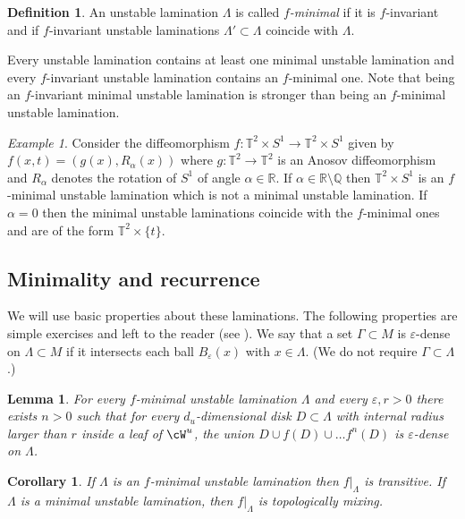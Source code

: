 \documentclass[a4paper,11pt]{amsart}
\numberwithin{equation}{section}     %
\def\QQ{{\mathbb Q}} \def\RR{{\mathbb R}} \def\SS{{\mathbb S}} \def\TT{{\mathbb T}}
\newtheorem{cor}[teo]{Corollary}
\newtheorem{lema}[teo]{Lemma}
\theoremstyle{definition}
\newtheorem{defi}[teo]{Definition}
\theoremstyle{remark}
\newtheorem{ej}[teo]{Example}
\newcommand{\eps}{\varepsilon}
\begin{document}
\begin{defi}
An unstable lamination $\Lambda$ is called \emph{$f$-minimal} if it is $f$-invariant and if
$f$-invariant unstable laminations $\Lambda' \subset \Lambda$ coincide with $\Lambda$. 
\end{defi} 

Every unstable lamination contains at least one minimal unstable lamination and every $f$-invariant unstable lamination contains an $f$-minimal one. Note that being an $f$-invariant minimal unstable lamination is stronger than being an $f$-minimal unstable lamination. 

\begin{ej} 
Consider the diffeomorphism $f: \TT^2 \times S^1 \to \TT^2 \times S^1$ given by $f(x,t) = (g (x), R_\alpha(x))$ where $g: \TT^2 \to \TT^2$ is an Anosov diffeomorphism and $R_\alpha$ denotes the rotation of $S^1$ of angle $\alpha \in \RR$. If $\alpha \in \RR \setminus \QQ$ then $\TT^2 \times S^1$ is an $f$-minimal unstable lamination which is not a minimal unstable lamination. If $\alpha=0$ then the minimal unstable laminations coincide with the $f$-minimal ones and are of the form $\TT^2 \times \{t\}$. 
\end{ej}

\subsection{Minimality and recurrence} 
We will use basic properties about these laminations. The following properties are simple exercises and left to the reader (see \cite{CroPot}). 
We say that a set $\Gamma \subset M$ is $\eps$-dense on $\Lambda \subset M$ if it intersects
each ball $B_\eps(x)$ with $x \in \Lambda$. (We do not require $\Gamma\subset \Lambda$.)

\begin{lema}\label{p.fminimalit}
For every $f$-minimal unstable lamination $\Lambda$ and every $\eps,r>0$ there exists $n>0$ such that for every $d_u$-dimensional disk $D\subset \Lambda$ with internal radius larger than $r$ inside
a leaf of $\cW^u$, the union $D \cup f(D) \cup \ldots f^{n}(D)$ is $\eps$-dense on $\Lambda$. 
\end{lema}

\begin{cor}\label{c.minimaltransitive}
If $\Lambda$ is an $f$-minimal unstable lamination then $f|_\Lambda$ is transitive. If $\Lambda$ is a minimal unstable lamination, then $f|_\Lambda$ is topologically mixing.  
\end{cor}
\end{document}

